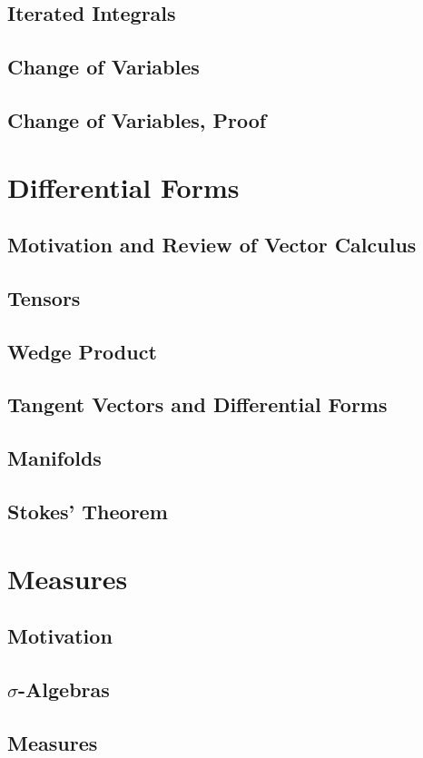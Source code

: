 \documentclass{article}
\theoremstyle{definition}
\begin{document}
\subsection{Iterated Integrals}
\subsection{Change of Variables}
\subsection{Change of Variables, Proof}
\section{Differential Forms}
\subsection{Motivation and Review of Vector Calculus}
\subsection{Tensors}
\subsection{Wedge Product}
\subsection{Tangent Vectors and Differential Forms}
\subsection{Manifolds}
\subsection{Stokes' Theorem}
\section{Measures}
\subsection{Motivation}
\subsection{$ \sigma $-Algebras}
\subsection{Measures}
\end{document}
